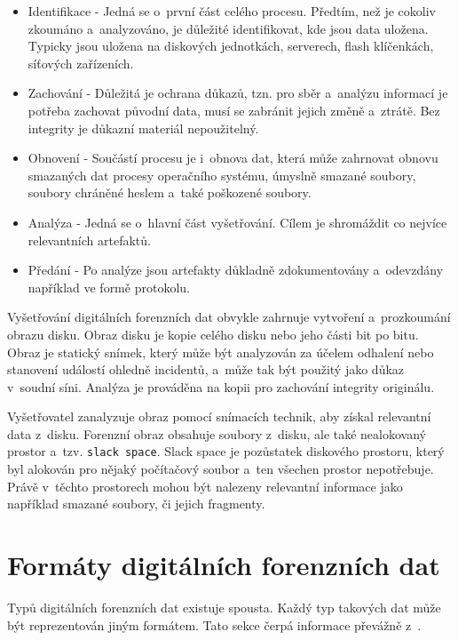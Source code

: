 \begin{itemize}
\item Identifikace - Jedná se o~první část celého procesu. Předtím, než je cokoliv zkoumáno a~analyzováno, je důležité identifikovat, kde jsou data uložena. Typicky jsou uložena na diskových jednotkách, serverech, flash klíčenkách, síťových zařízeních.

\item Zachování - Důležitá je ochrana důkazů, tzn. pro sběr a~analýzu informací je potřeba zachovat původní data, musí se zabránit jejich změně a~ztrátě. Bez integrity je důkazní materiál nepoužitelný.

\item Obnovení - Součástí procesu je i~obnova dat, která může zahrnovat obnovu smazaných dat procesy operačního systému, úmyslně smazané soubory, soubory chráněné heslem a~také poškozené soubory.

\item Analýza - Jedná se o~hlavní část vyšetřování. Cílem je shromáždit co nejvíce relevantních artefaktů.

\item Předání - Po analýze jsou artefakty důkladně zdokumentovány a~odevzdány například ve formě protokolu.
\end{itemize}

\noindent Vyšetřování digitálních forenzních dat obvykle zahrnuje vytvoření a~prozkoumání obrazu disku. Obraz disku je kopie celého disku nebo jeho části bit po bitu. Obraz je statický snímek, který může být analyzován za účelem odhalení nebo stanovení událostí ohledně incidentů, a~může tak být použitý jako důkaz v~soudní síni. Analýza je prováděna na kopii pro zachování integrity originálu.

Vyšetřovatel zanalyzuje obraz pomocí snímacích technik, aby získal relevantní data z~disku. Forenzní obraz obsahuje soubory z~disku, ale také nealokovaný prostor a~tzv. \texttt{slack space}. Slack space je pozůstatek diskového prostoru, který byl alokován pro nějaký počítačový soubor a~ten všechen prostor nepotřebuje. Právě v~těchto prostorech mohou být nalezeny relevantní informace jako například smazané soubory, či jejich fragmenty. \cite{forensicImages}

\section{Formáty digitálních forenzních dat}
Typů digitálních forenzních dat existuje spousta. Každý typ takových dat může být reprezentován jiným formátem. Tato sekce čerpá informace převážně z~\cite{forensicswikiForensicFF}.


